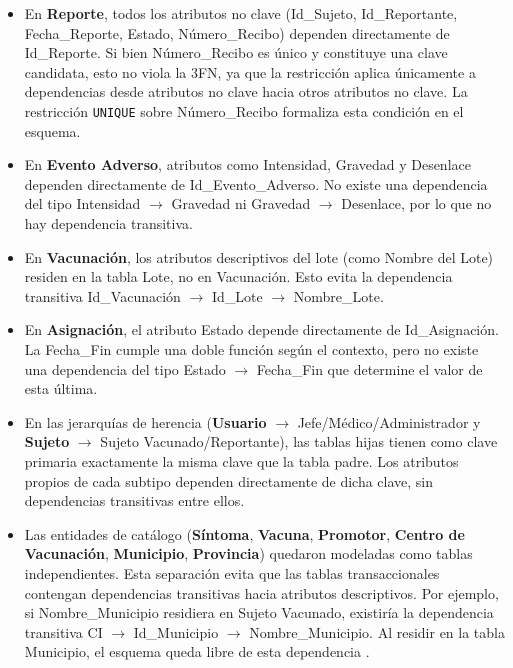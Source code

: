 \begin{itemize}
    \item En \textbf{Reporte}, todos los atributos no clave (Id\_Sujeto, Id\_Reportante, Fecha\_Reporte, Estado, Número\_Recibo) dependen directamente de Id\_Reporte. Si bien Número\_Recibo es único y constituye una clave candidata, esto no viola la 3FN, ya que la restricción aplica únicamente a dependencias desde atributos no clave hacia otros atributos no clave. La restricción \texttt{UNIQUE} sobre Número\_Recibo formaliza esta condición en el esquema.
    
    \item En \textbf{Evento Adverso}, atributos como Intensidad, Gravedad y Desenlace dependen directamente de Id\_Evento\_Adverso. No existe una dependencia del tipo Intensidad $\rightarrow$ Gravedad ni Gravedad $\rightarrow$ Desenlace, por lo que no hay dependencia transitiva.
    
    \item En \textbf{Vacunación}, los atributos descriptivos del lote (como Nombre del Lote) residen en la tabla Lote, no en Vacunación. Esto evita la dependencia transitiva Id\_Vacunación $\rightarrow$ Id\_Lote $\rightarrow$ Nombre\_Lote.
    
    \item En \textbf{Asignación}, el atributo Estado depende directamente de Id\_Asignación. La Fecha\_Fin cumple una doble función según el contexto, pero no existe una dependencia del tipo Estado $\rightarrow$ Fecha\_Fin que determine el valor de esta última.
    
    \item En las jerarquías de herencia (\textbf{Usuario} $\rightarrow$ Jefe/Médico/Administrador y \textbf{Sujeto} $\rightarrow$ Sujeto Vacunado/Reportante), las tablas hijas tienen como clave primaria exactamente la misma clave que la tabla padre. Los atributos propios de cada subtipo dependen directamente de dicha clave, sin dependencias transitivas entre ellos.

    \item Las entidades de catálogo (\textbf{Síntoma}, \textbf{Vacuna}, \textbf{Promotor}, \textbf{Centro de Vacunación}, \textbf{Municipio}, \textbf{Provincia}) quedaron modeladas como tablas independientes. Esta separación evita que las tablas transaccionales contengan dependencias transitivas hacia atributos descriptivos. Por ejemplo, si Nombre\_Municipio residiera en Sujeto Vacunado, existiría la dependencia transitiva CI $\rightarrow$ Id\_Municipio $\rightarrow$ Nombre\_Municipio. Al residir en la tabla Municipio, el esquema queda libre de esta dependencia \cite{silberschatz2019}.
    
\end{itemize}


